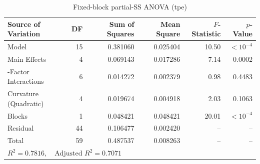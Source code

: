 \begin{table}[htbp]
\centering
\caption{Fixed-block partial-SS ANOVA (tpe)}
\label{tab:anova_0_tpe_val_loss}
\begin{tabular}{lrrrrr}
\hline
\textbf{Source of Variation} & \textbf{DF} & \textbf{Sum of Squares} & \textbf{Mean Square} & \textbf{$F$-Statistic} & \textbf{$p$-Value} \\
\hline
Model & 15 & 0.381060 & 0.025404 & 10.50 & $< 10^{-4}$ \\
\quad Main Effects & 4 & 0.069143 & 0.017286 & 7.14 & 0.0002 \\
\quad 2-Factor Interactions & 6 & 0.014272 & 0.002379 & 0.98 & 0.4483 \\
\quad Curvature (Quadratic) & 4 & 0.019674 & 0.004918 & 2.03 & 0.1063 \\
\quad Blocks & 1 & 0.048421 & 0.048421 & 20.01 & $< 10^{-4}$ \\
Residual & 44 & 0.106477 & 0.002420 & -- & -- \\
Total & 59 & 0.487537 & 0.008263 & -- & -- \\
\hline
\multicolumn{6}{l}{\small $R^2 = 0.7816, \quad \text{Adjusted } R^2 = 0.7071$} \\
\hline
\end{tabular}
\end{table}